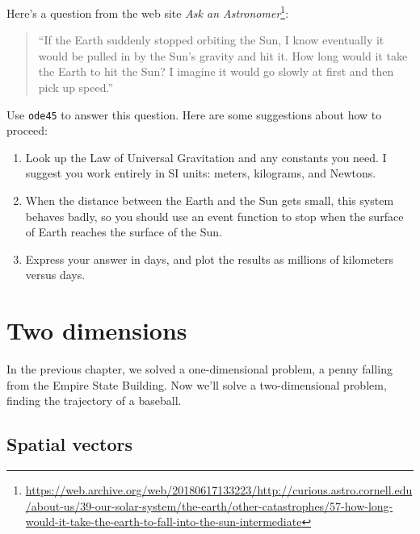 \documentclass[
]{book}
\numberwithin{Answer}{chapter}
\numberwithin{Exercise}{chapter}
\begin{document}
\begin{ex}
\label{ex:earth}


Here's a question from the web site {\em Ask an Astronomer}\footnote{\url{https://web.archive.org/web/20180617133223/http://curious.astro.cornell.edu/about-us/39-our-solar-system/the-earth/other-catastrophes/57-how-long-would-it-take-the-earth-to-fall-into-the-sun-intermediate}}:

\begin{quote}
``If the Earth suddenly stopped orbiting the Sun, I know eventually it would be pulled in by the Sun's gravity and hit it. How long would it take the Earth to hit the Sun? I imagine it would go slowly at first and then pick up speed.''
\end{quote}

Use {\tt ode45} to answer this question.  Here are some suggestions about how to proceed:

\begin{enumerate}

\item Look up the Law of Universal Gravitation and any constants you need. I suggest you work entirely in SI units: meters, kilograms, and Newtons.

\item When the distance between the Earth and the Sun gets small, this system behaves badly, so you should use an event function to stop when the surface of Earth reaches the surface of the Sun.

\item Express your answer in days, and plot the results as millions of kilometers versus days.

\end{enumerate}

\end{ex}


\chapter{Two dimensions}

In the previous chapter, we solved a one-dimensional problem, a penny falling from the Empire State Building.  Now we'll solve a two-dimensional problem, finding the trajectory of a baseball.



\section{Spatial vectors}
\label{sect:spacial}
\end{document}
